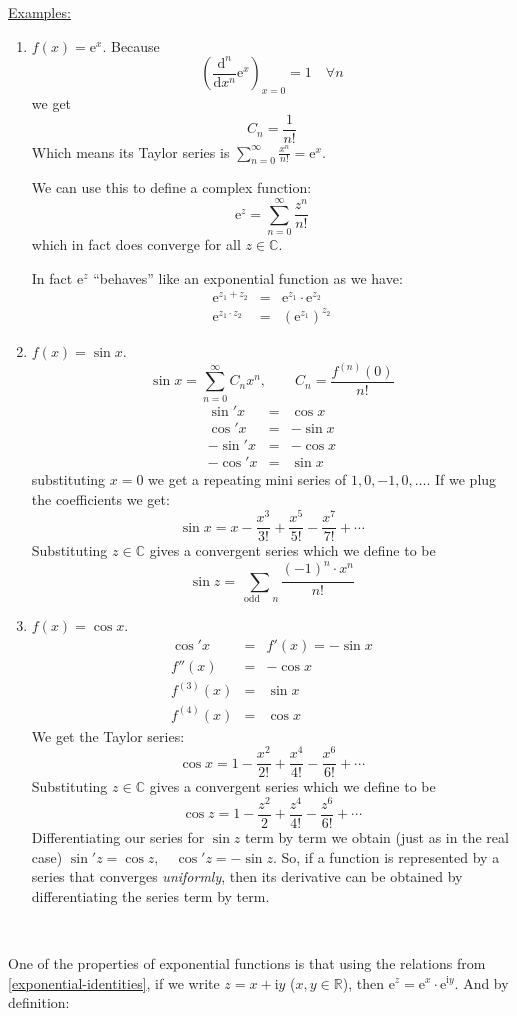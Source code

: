 \documentclass{article}
\newcommand{\mathd}{\mathrm{d}}
\newcommand{\mathe}{\mathrm{e}}
\newcommand{\mathi}{\mathrm{i}}
\newcommand{\nospace}{}
\newcommand{\nosymbol}{}
\newcommand{\tmem}[1]{{\em #1\/}}
\newcommand{\tmop}[1]{\ensuremath{\operatorname{#1}}}
\newcommand{\tmxspace}{\hspace{1em}}
\newenvironment{enumeratenumeric}{\begin{enumerate}[1.] }{\end{enumerate}}
\begin{document}
{\underline{Examples:}}
\begin{enumeratenumeric}
  \item $f (x) = \mathe^x$. Because
  \[ \left( \frac{\mathd^n}{\mathd x^n} \mathe^x \right)_{x = 0} = \nospace 1
     \quad \forall n \]
  we get
  \[ C_n = \frac{1}{n!} \]
  Which means its Taylor series is $\sum_{n = 0}^{\infty} \frac{x^n}{n!} =
  \mathe^x$.
  
  We can use this to define a complex function:
  \[ \mathe^z = \sum_{n = 0}^{\infty} \frac{z^n}{n!} \]
  which in fact does converge for all $z \in \mathbb{C}$.
  
  In fact $\mathe^z$ ``behaves'' like an exponential function as we have:
  \begin{eqnarray}
    \mathe^{z_1 + z_2} & = & \mathe^{z_1} \cdot \mathe^{z_2}
    \label{exponential-identities} \\
    \mathe^{z_1 \cdot z_2} & = & (\mathe^{z_1})^{z_2} \nonumber
  \end{eqnarray}
  \item {}$f (x) = \sin x$.
  \[ \sin x = \sum_{n = 0}^{\infty} C_n x^n, \qquad C_n = \frac{f^{(n)}
     (0)}{n!} \]
  \begin{eqnarray*}
    \sin' x & = & \cos x\\
    \cos' x & = & - \sin x\\
    - \sin' x & = & - \cos x\\
    - \cos' x & = & \sin x
  \end{eqnarray*}
  substituting $x = 0$ we get a repeating mini series of $1, 0, - 1, 0,
  \ldots$. If we plug the coefficients we get:
  \[ \sin x = x - \frac{x^3}{3!} + \frac{x^5}{5!} - \frac{x^7}{7!} + \cdots \]
  Substituting $z \in \mathbb{C}$ gives a convergent series which we define to
  be
  \[ \sin z = \sum_{\tmop{odd} \quad n} \frac{(- 1)^n_{\nosymbol} \cdot
     x^n}{n!} \]
  \item $f (x) = \cos x$.
  \begin{eqnarray*}
    \cos' x & = & f' (x) = - \sin x\\
    f'' (x) & = & - \cos x\\
    f^{(3)} (x) & = & \sin x\\
    f^{(4)} (x) & = & \cos x
  \end{eqnarray*}
  We get the Taylor series:
  \[ \cos x = 1 - \frac{x^2}{2!} + \frac{x^4}{4!} - \frac{x^6}{6!} + \cdots \]
  Substituting $z \in \mathbb{C}$ gives a convergent series which we define to
  be
  \[ \cos z = 1 - \frac{z^2}{2} + \frac{z^4}{4!} - \frac{z^6}{6!} + \cdots \]
  Differentiating our series for $\sin z$ term by term we obtain (just as in
  the real case) $\sin' z = \cos z, \tmxspace \cos' z = - \sin z$. So, if a
  function is represented by a series that converges {\tmem{uniformly}}, then
  its derivative can be obtained by differentiating the series term by term.
  
  \ 
\end{enumeratenumeric}
One of the properties of exponential functions is that using the relations
from \eqref{exponential-identities}, if we write $z = x + \mathi y$ ($x, y \in
\mathbb{R}$), then $\mathe^z = \mathe^x \cdot \mathe^{\mathi y}$. And by
definition:
\end{document}
